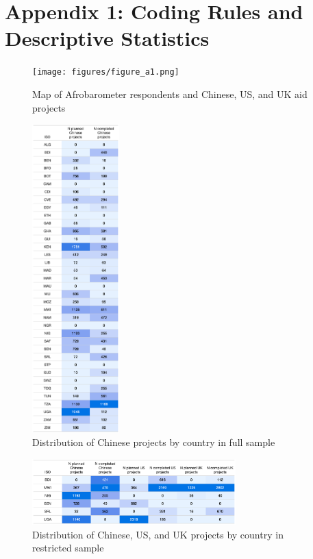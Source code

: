 \documentclass[9pt]{article}
\begin{document}
\renewcommand\thefigure{A\arabic{figure}}    
\renewcommand\thetable{A\arabic{table}}    

\setcounter{figure}{0} 
\setcounter{table}{0} 

\newpage
\appendix
\section{Appendix 1: Coding Rules and Descriptive Statistics}

\begin{figure}[H]
\centering
\texttt{[image: figures/figure\_a1.png]}
\caption{Map of Afrobarometer respondents and Chinese, US, and UK aid projects}
\end{figure}

\begin{figure}[H]
\centering
\includegraphics[width=0.3\textwidth]{figures/figure_a2.png}
\caption{Distribution of Chinese projects by country in full sample}
\end{figure}

\begin{figure}[H]
\centering
\includegraphics[width=0.7\textwidth]{figures/figure_a3.png}
\caption{Distribution of Chinese, US, and UK projects by country in restricted sample}
\end{figure}
\end{document}
